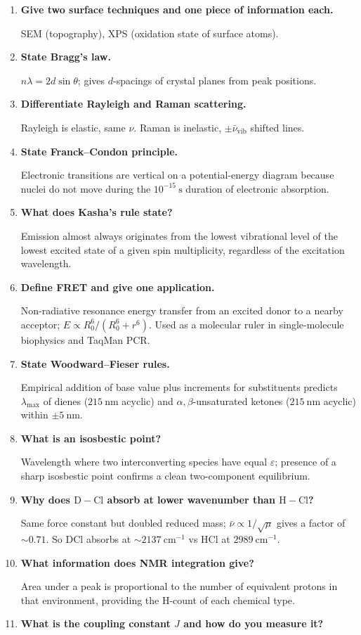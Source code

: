 \documentclass[12pt,a4paper]{article}
\newcommand{\Q}[1]{\textbf{#1}\par\noindent\ignorespaces}
\begin{document}
\begin{tcolorbox}[exambox, title={Frequently Asked / Viva Questions}]
\begin{enumerate}[topsep=0pt, label=\textbf{Q\arabic*.}, itemsep=5pt]
    Through differences in proton density, $T_1$ and $T_2$ relaxation times of water in each tissue.
  \item \Q{Give two surface techniques and one piece of information each.}
    SEM (topography), XPS (oxidation state of surface atoms).
  \item \Q{State Bragg's law.}
    $n\lambda = 2d\sin\theta$; gives $d$-spacings of crystal planes from peak positions.
  \item \Q{Differentiate Rayleigh and Raman scattering.}
    Rayleigh is elastic, same $\nu$. Raman is inelastic, $\pm \bar{\nu}_{\mathrm{vib}}$ shifted lines.
  \item \Q{State Franck--Condon principle.}
    Electronic transitions are vertical on a potential-energy diagram because nuclei do not move during the $10^{-15}\ \mathrm{s}$ duration of electronic absorption.
  \item \Q{What does Kasha's rule state?}
    Emission almost always originates from the lowest vibrational level of the lowest excited state of a given spin multiplicity, regardless of the excitation wavelength.
  \item \Q{Define FRET and give one application.}
    Non-radiative resonance energy transfer from an excited donor to a nearby acceptor; $E\propto R_0^{6}/(R_0^{6}+r^{6})$. Used as a molecular ruler in single-molecule biophysics and TaqMan PCR.
  \item \Q{State Woodward--Fieser rules.}
    Empirical addition of base value plus increments for substituents predicts $\lambda_{\max}$ of dienes ($215\ \mathrm{nm}$ acyclic) and $\alpha,\beta$-unsaturated ketones ($215\ \mathrm{nm}$ acyclic) within $\pm 5\ \mathrm{nm}$.
  \item \Q{What is an isosbestic point?}
    Wavelength where two interconverting species have equal $\varepsilon$; presence of a sharp isosbestic point confirms a clean two-component equilibrium.
  \item \Q{Why does $\mathrm{D{-}Cl}$ absorb at lower wavenumber than $\mathrm{H{-}Cl}$?}
    Same force constant but doubled reduced mass; $\bar{\nu}\propto 1/\sqrt{\mu}$ gives a factor of $\sim 0.71$. So DCl absorbs at $\sim 2137\ \mathrm{cm^{-1}}$ vs HCl at $2989\ \mathrm{cm^{-1}}$.
  \item \Q{What information does NMR integration give?}
    Area under a peak is proportional to the number of equivalent protons in that environment, providing the H-count of each chemical type.
  \item \Q{What is the coupling constant $J$ and how do you measure it?}

\end{enumerate}
\end{tcolorbox}
\end{document}
